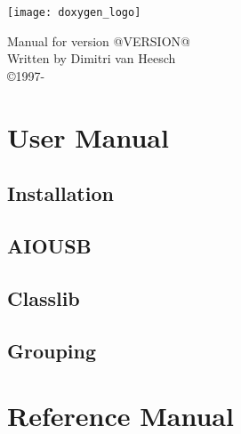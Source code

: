 \documentclass{book}
\newcommand{\+}{\discretionary{\mbox{\scriptsize$\hookleftarrow$}}{}{}}
\newcommand{\thisyear}{\the\year}
\begin{document}
\begin{titlepage}
\texttt{[image: doxygen\_logo]}
\begin{center}
Manual for version @VERSION@\\[2ex]
Written by Dimitri van Heesch\\[2ex]
\copyright 1997-\thisyear
\end{center}
\end{titlepage}
\clearemptydoublepage
\tableofcontents
\clearemptydoublepage
{}
\part{User Manual}
\chapter{Installation}\label{install}\hypertarget{install}{}
\chapter{AIOUSB}\label{aiousb}\hypertarget{aiousb}{}
\chapter{Classlib}\label{classlib}\hypertarget{classlib}{}
\chapter{Grouping}\label{grouping}\hypertarget{grouping}{}
\part{Reference Manual}

\printindex
\end{document}
